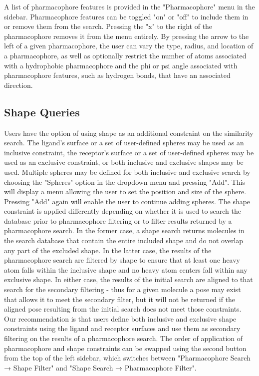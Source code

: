 A list of pharmacophore features is provided in the "Pharmacophore" menu in the sidebar. Pharmacophore features can be toggled "on" or "off" to include them in or remove them from the search. Pressing the "x" to the right of the pharmacophore removes it from the menu entirely. By pressing the arrow to the left of a given pharmacophore, the user can vary the type, radius, and location of a pharmacophore, as well as optionally restrict the number of atoms associated with a hydrophobic pharmacophore and the phi or psi angle associated with pharmacophore features, such as hydrogen bonds, that have an associated direction.


\subsection{Shape Queries}

\cite{matchpack}\cite{vams}
Users have the option of using shape as an additional constraint on the similarity search. The ligand's surface or a set of user-defined spheres may be used as an inclusive constraint, the receptor's surface or a set of user-defined spheres may be used as an exclusive constraint, or both inclusive and exclusive shapes may be used. Multiple spheres may be defined for both inclusive and exclusive search by choosing the "Spheres" option in the dropdown menu and pressing "Add". This will display a menu allowing the user to set the position and size of the sphere. Pressing "Add" again will enable the user to continue adding spheres. The shape constraint is applied differently depending on whether it is used to search the database prior to pharmacophore filtering or to filter results returned by a pharmacophore search. In the former case, a shape search returns molecules in the search database that contain the entire included shape and do not overlap any part of the excluded shape. In the latter case, the results of the pharmacophore search are filtered by shape to ensure that at least one heavy atom falls within the inclusive shape and no heavy atom centers fall within any exclusive shape. In either case, the results of the initial search are aligned to that search for the secondary filtering - thus for a given molecule a pose may exist that allows it to meet the secondary filter, but it will not be returned if the aligned pose resulting from the initial search does not meet those constraints. Our recommendation is that users define both inclusive and exclusive shape constraints using the ligand and receptor surfaces and use them as secondary filtering on the results of a pharmacophore search. The order of application of pharmacophore and shape constraints can be swapped using the second button from the top of the left sidebar, which switches between "Pharmacophore Search → Shape Filter" and "Shape Search → Pharmacophore Filter".
